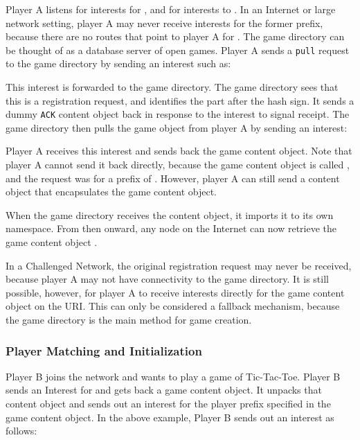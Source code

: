 \documentclass[a4paper,12pt]{report}      %
\begin{document}
Player A listens for interests for \texttt{}, and for interests to
\texttt{}. In an Internet or large network setting, player A may never
receive interests for the former prefix, because there are no routes that point to player A for
\texttt{}. The game directory can be thought of as a
database server of open games. Player A sends a \verb!pull! request to the game directory by sending an
interest such as:
\texttt{}

This interest is forwarded to the game directory. The game directory sees that this is a registration
request, and identifies the part after the hash sign. It sends a dummy \verb!ACK! content object back in
response to the interest to signal receipt. The game directory then pulls the game object from
player A by sending an interest: \texttt{}

Player A receives this interest and sends back the game content object. Note that player A cannot send it
back directly, because the game content object is called \texttt{}, 
and the request was for a prefix of \texttt{}. However, player A can still
send a content object that encapsulates the game content object.

When the game directory receives the content object, it imports it to its own namespace. From then
onward, any node on the Internet can now retrieve the game content object
\texttt{}.

In a Challenged Network, the original registration request may never be received, because player A may not have
connectivity to the game directory. It is still possible, however, for player A to receive interests directly for the
game content object on the \texttt{} URI. This can only be
considered a fallback mechanism, because the game directory is the main method for game creation.

\subsubsection{Player Matching and Initialization}

Player B joins the network and wants to play a game of Tic-Tac-Toe. Player B sends an Interest for
\texttt{} and gets back a game content object. It unpacks that content
object and sends out an interest for the player prefix specified in the game content object. In the above
example, Player B sends out an interest as follows:
\end{document}
